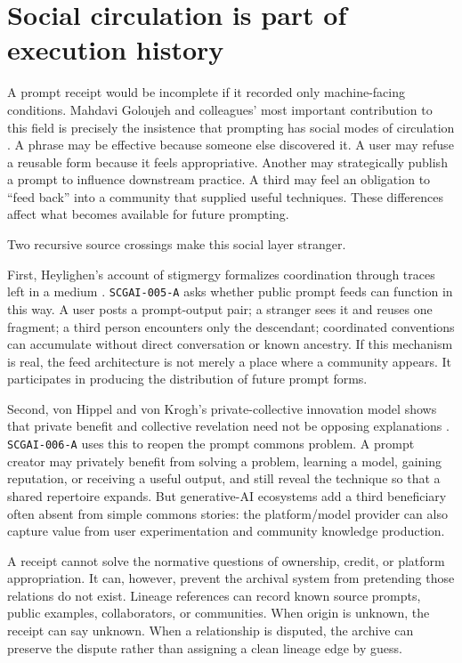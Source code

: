 \documentclass[11pt]{article}
\newcommand{\zettel}[1]{\texttt{#1}}
\begin{document}
\section{Social circulation is part of execution history}

A prompt receipt would be incomplete if it recorded only machine-facing conditions. Mahdavi Goloujeh and colleagues' most important contribution to this field is precisely the insistence that prompting has social modes of circulation \cite{mahdavigoloujeh2024social}. A phrase may be effective because someone else discovered it. A user may refuse a reusable form because it feels appropriative. Another may strategically publish a prompt to influence downstream practice. A third may feel an obligation to ``feed back'' into a community that supplied useful techniques. These differences affect what becomes available for future prompting.

Two recursive source crossings make this social layer stranger.

First, Heylighen's account of stigmergy formalizes coordination through traces left in a medium \cite{heylighen2016stigmergy}. \zettel{SCGAI-005-A} asks whether public prompt feeds can function in this way. A user posts a prompt-output pair; a stranger sees it and reuses one fragment; a third person encounters only the descendant; coordinated conventions can accumulate without direct conversation or known ancestry. If this mechanism is real, the feed architecture is not merely a place where a community appears. It participates in producing the distribution of future prompt forms.

Second, von Hippel and von Krogh's private-collective innovation model shows that private benefit and collective revelation need not be opposing explanations \cite{vonhippel2003privatecollective}. \zettel{SCGAI-006-A} uses this to reopen the prompt commons problem. A prompt creator may privately benefit from solving a problem, learning a model, gaining reputation, or receiving a useful output, and still reveal the technique so that a shared repertoire expands. But generative-AI ecosystems add a third beneficiary often absent from simple commons stories: the platform/model provider can also capture value from user experimentation and community knowledge production.

A receipt cannot solve the normative questions of ownership, credit, or platform appropriation. It can, however, prevent the archival system from pretending those relations do not exist. Lineage references can record known source prompts, public examples, collaborators, or communities. When origin is unknown, the receipt can say unknown. When a relationship is disputed, the archive can preserve the dispute rather than assigning a clean lineage edge by guess.
\end{document}
